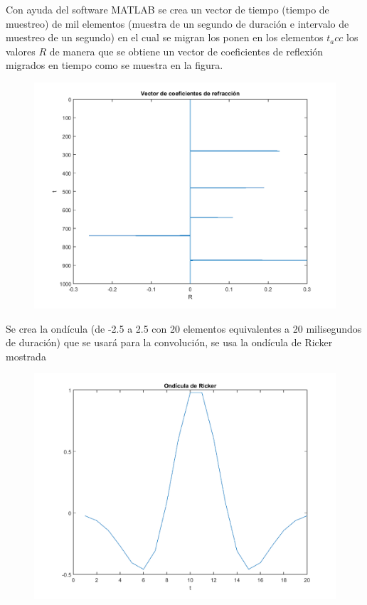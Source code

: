 \documentclass[%
 aip,
 jmp,%
 amsmath,amssymb,
 reprint,%
]{revtex4-1}
\begin{document}
Con ayuda del software MATLAB se crea un vector de tiempo (tiempo de muestreo) de mil elementos (muestra de un segundo de duración e intervalo de muestreo de un segundo) en el cual se migran los ponen en los elementos $t_acc$ los valores $R$ de manera que se obtiene un vector de coeficientes de reflexión migrados en tiempo como se muestra en la figura.
\begin{figure}[h]
\centering
\includegraphics[width=1.\linewidth]{RC1}
\caption{}
\label{fig:RC1}
\end{figure}

Se crea la ondícula (de -2.5 a 2.5 con 20 elementos equivalentes a 20 milisegundos de duración) que se usará para la convolución, se usa la ondícula de Ricker mostrada


\begin{figure}[h]
\centering
\includegraphics[width=1.\linewidth]{ondicula}
\caption{}
\label{fig:ondicula}
\end{figure}
\end{document}
